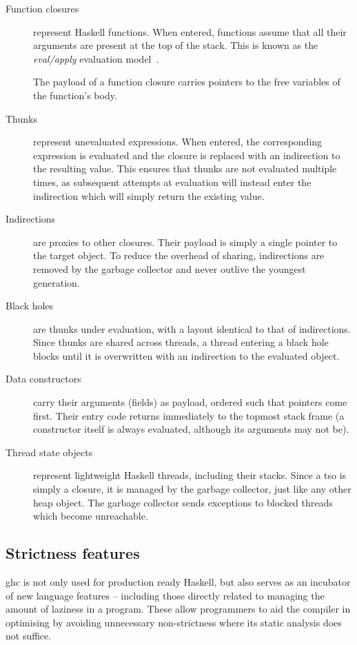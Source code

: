 \documentclass[thesis=B,english]{FITthesis}[2019/12/23]
\begin{document}
\begin{description}
	\item[Function closures] represent Haskell functions. When entered,
		functions assume that all their arguments are present at the top of the
		stack. This is known as the \textit{eval/apply} evaluation
		model~\cite{eval-apply}.

		The payload of a function closure carries pointers to the free
		variables of the function's body.

	\item[Thunks] represent unevaluated expressions. When entered, the
		corresponding expression is evaluated and the closure is replaced with
		an indirection to the resulting value. This ensures that thunks are not
		evaluated multiple times, as subsequent attempts at evaluation will
		instead enter the indirection which will simply return the existing
		value.

	\item[Indirections] are proxies to other closures. Their payload is simply
		a single pointer to the target object. To reduce the overhead of
		sharing, indirections are removed by the garbage collector and never
		outlive the youngest generation.

	\item[Black holes] are thunks under evaluation, with a layout identical to
		that of indirections. Since thunks are shared across threads, a thread
		entering a black hole blocks until it is overwritten with an
		indirection to the evaluated object.

	\item[Data constructors] carry their arguments (fields) as payload, ordered
		such that pointers come first. Their entry code returns immediately to
		the topmost stack frame (a constructor itself is always evaluated,
		although its arguments may not be).

	\item[Thread state objects] represent lightweight Haskell threads,
		including their stacks. Since a \acrshort{tso} is simply a closure, it
		is managed by the garbage collector, just like any other heap object.
		The garbage collector sends exceptions to blocked threads which become
		unreachable.
\end{description}


\subsection{Strictness features}
\acrshort{ghc} is not only used for production ready Haskell, but also serves
as an incubator of new language features -- including those directly related to
managing the amount of laziness in a program. These allow programmers to aid
the compiler in optimising by avoiding unnecessary non-strictness where its
static analysis does not suffice.
\end{document}
